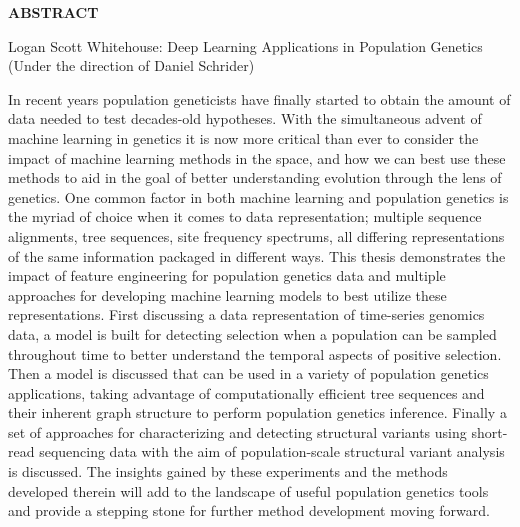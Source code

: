 \begin{center}
\vspace*{52pt}
{\normalfont\textbf{ABSTRACT}}
\vspace{11pt}

\begin{singlespace}
Logan Scott Whitehouse: Deep Learning Applications in Population Genetics \\
(Under the direction of Daniel Schrider)
\end{singlespace}
\end{center}
In recent years population geneticists have finally started to obtain the amount of data needed to test decades-old hypotheses. With the simultaneous advent of machine learning in genetics it is now more critical than ever to consider the impact of machine learning methods in the space, and how we can best use these methods to aid in the goal of better understanding evolution through the lens of genetics. One common factor in both machine learning and population genetics is the myriad of choice when it comes to data representation; multiple sequence alignments, tree sequences, site frequency spectrums, all differing representations of the same information packaged in different ways. This thesis demonstrates the impact of feature engineering for population genetics data and multiple approaches for developing machine learning models to best utilize these representations. First discussing a data representation of time-series genomics data, a model is built for detecting selection when a population can be sampled throughout time to better understand the temporal aspects of positive selection. Then a model is discussed that can be used in a variety of population genetics applications, taking advantage of computationally efficient tree sequences and their inherent graph structure to perform population genetics inference. Finally a set of approaches for characterizing and detecting structural variants using short-read sequencing data with the aim of population-scale structural variant analysis is discussed. The insights gained by these experiments and the methods developed therein will add to the landscape of useful population genetics tools and provide a stepping stone for further method development moving forward. 
\clearpage
